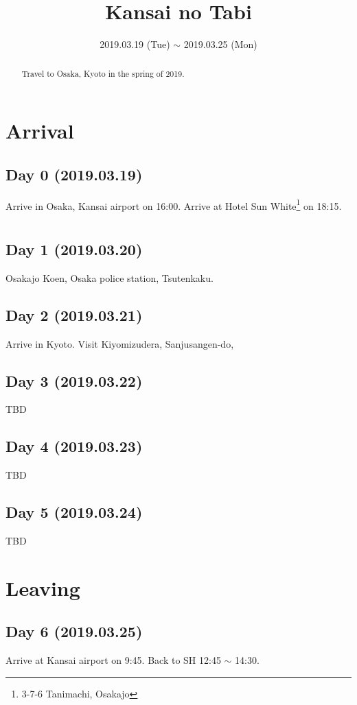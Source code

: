 \documentclass{article}
\title{Kansai no Tabi}
\date{2019.03.19 (Tue) $\sim$ 2019.03.25 (Mon)}
\begin{document}
\maketitle

\begin{abstract}
Travel to Osaka, Kyoto in the spring of 2019.
\end{abstract}


\section{Arrival}
\subsection{Day 0 (2019.03.19)}
Arrive in Osaka, Kansai airport on 16:00.
Arrive at Hotel Sun White\footnote{3-7-6 Tanimachi, Osakajo} on 18:15.

\section{}
\subsection{Day 1 (2019.03.20)}
Osakajo Koen, Osaka police station, Tsutenkaku.

\subsection{Day 2 (2019.03.21)}
Arrive in Kyoto.
Visit Kiyomizudera, Sanjusangen-do,

\subsection{Day 3 (2019.03.22)}
TBD

\subsection{Day 4 (2019.03.23)}
TBD

\subsection{Day 5 (2019.03.24)}
TBD

\section{Leaving}
\subsection{Day 6 (2019.03.25)}
Arrive at Kansai airport on 9:45.
Back to SH 12:45 $\sim $ 14:30.
\end{document}
